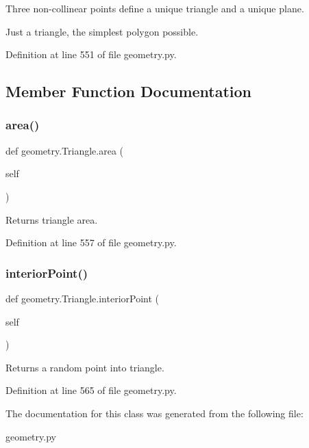 Three non-\/collinear points define a unique triangle and a unique plane.\begin{DoxyVerb}Just a triangle, the simplest polygon possible.\end{DoxyVerb}
 

Definition at line 551 of file geometry.\+py.



\subsection{Member Function Documentation}
\mbox{\label{classgeometry_1_1Triangle_aefd0596cf3d91438d5214c303d426bc6}} 
\subsubsection{\texorpdfstring{area()}{area()}}
{\footnotesize\ttfamily def geometry.\+Triangle.\+area (\begin{DoxyParamCaption}\item[{}]{self }\end{DoxyParamCaption})}

\begin{DoxyVerb}Returns triangle area.\end{DoxyVerb}
 

Definition at line 557 of file geometry.\+py.

\mbox{\label{classgeometry_1_1Triangle_a714f4af89b1855e957797e2c53568893}} 
\subsubsection{\texorpdfstring{interior\+Point()}{interiorPoint()}}
{\footnotesize\ttfamily def geometry.\+Triangle.\+interior\+Point (\begin{DoxyParamCaption}\item[{}]{self }\end{DoxyParamCaption})}

\begin{DoxyVerb}Returns a random point into triangle.\end{DoxyVerb}
 

Definition at line 565 of file geometry.\+py.



The documentation for this class was generated from the following file\+:\begin{DoxyCompactItemize}
\item 
geometry.\+py\end{DoxyCompactItemize}
